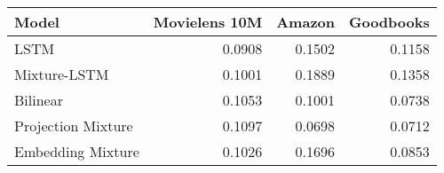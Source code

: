 \begin{tabular}{lrrr}
\toprule
 Model              &   Movielens 10M &   Amazon &   Goodbooks \\
\midrule
 LSTM               &          0.0908 &   0.1502 &      0.1158 \\
 Mixture-LSTM       &          0.1001 &   0.1889 &      0.1358 \\
 \midrule
 Bilinear           &          0.1053 &   0.1001 &      0.0738 \\
 Projection Mixture &          0.1097 &   0.0698 &      0.0712 \\
 Embedding Mixture  &          0.1026 &   0.1696 &      0.0853 \\
\bottomrule
\end{tabular}